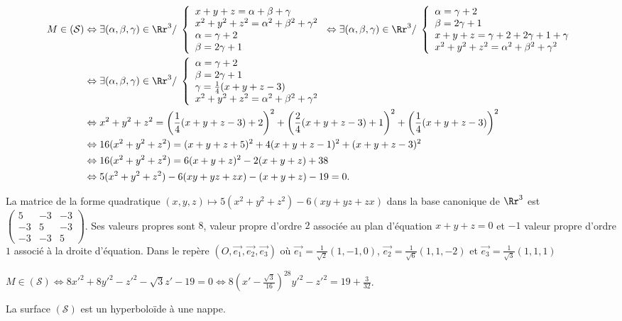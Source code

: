 {{\begin{align*}
M\in(\mathcal{S})&\Leftrightarrow\exists(\alpha,\beta,\gamma)\in\Rr^3/\;\left\{
\begin{array}{l}
x+y+z=\alpha+\beta+\gamma\\
x^2+y^2+z^2=\alpha^2+\beta^2+\gamma^2\\
\alpha=\gamma+2\\
\beta=2\gamma+1
\end{array}
\right.\Leftrightarrow\exists(\alpha,\beta,\gamma)\in\Rr^3/\;\left\{
\begin{array}{l}
\alpha=\gamma+2\\
\beta=2\gamma+1\\
x+y+z=\gamma+2+2\gamma+1+\gamma\\
x^2+y^2+z^2=\alpha^2+\beta^2+\gamma^2
\end{array}
\right. \\
&\Leftrightarrow\exists(\alpha,\beta,\gamma)\in\Rr^3/\;\left\{
\begin{array}{l}
\alpha=\gamma+2\\
\beta=2\gamma+1\\
\gamma=\frac{1}{4}(x+y+z-3)\\
x^2+y^2+z^2=\alpha^2+\beta^2+\gamma^2
\end{array}
\right.\\
 &\Leftrightarrow x^2+y^2+z^2 =\left(\frac{1}{4}(x+y+z-3)+2\right)^2 +\left(\frac{2}{4}(x+y+z-3)+1\right)^2 +\left(\frac{1}{4}(x+y+z-3)\right)^2\\
 &\Leftrightarrow16(x^2+y^2+z^2) =(x+y+z+5)^2+4(x+y+z-1)^2+(x+y+z-3)^2 \\
 &\Leftrightarrow16(x^2+y^2+z^2) = 6(x+y+z)^2-2(x+y+z) + 38\\
 &\Leftrightarrow5(x^2+y^2+z^2) -6(xy+yz+zx)-(x+y+z)-19 = 0.
\end{align*}

\begin{center}
\end{center}

La matrice de la forme quadratique $(x,y,z)\mapsto5(x^2+y^2+z^2) -6(xy+yz+zx)$ dans la base canonique de $\Rr^3$ est $\left(
\begin{array}{ccc}
5&-3&-3\\
-3&5&-3\\
-3&-3&5
\end{array}
\right)$. Ses valeurs propres sont $8$, valeur propre d'ordre $2$ associée au plan d'équation $x+y+z=0$ et $-1$ valeur propre d'ordre $1$ associé à la droite d'équation. Dans le repère $\left(O,\overrightarrow{e_1},\overrightarrow{e_2},\overrightarrow{e_3}\right)$ où $\overrightarrow{e_1}=\frac{1}{\sqrt{2}}(1,-1,0)$, $\overrightarrow{e_2}=\frac{1}{\sqrt{6}}(1,1,-2)$ et $\overrightarrow{e_3}=\frac{1}{\sqrt{3}}(1,1,1)$ 

\begin{center}
$M\in(\mathcal{S})\Leftrightarrow8x'^2+8y'^2-z'^2-\sqrt{3}z'-19=0\Leftrightarrow8\left(x'-\frac{\sqrt{3}}{16}\right)^28y'^2-z'^2=19+\frac{3}{32}$.
\end{center}

La surface $(\mathcal{S})$ est un hyperboloïde à une nappe.}
}